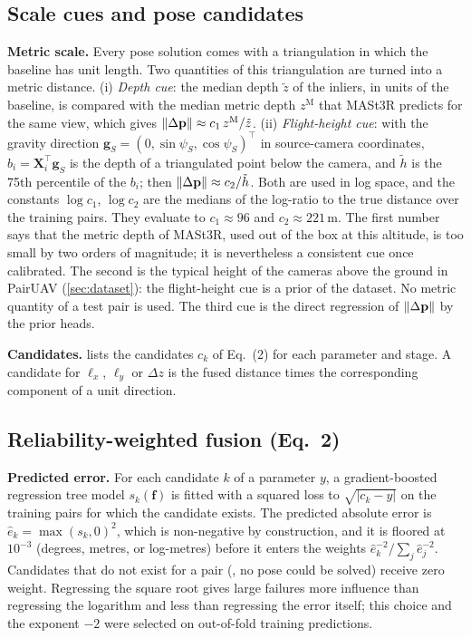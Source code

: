 \subsection{Scale cues and pose candidates}
\label{sec:cands}

\noindent\textbf{Metric scale.} Every pose solution comes with a triangulation in which the baseline has unit length. Two quantities of this triangulation are turned into a metric distance. (i) \emph{Depth cue}: the median depth $\tilde z$ of the inliers, in units of the baseline, is compared with the median metric depth $z^{\mathrm{M}}$ that MASt3R predicts for the same view, which gives $\|\Delta\mathbf{p}\|\approx c_1\,z^{\mathrm{M}}/\tilde z$. (ii) \emph{Flight-height cue}: with the gravity direction $\mathbf{g}_S=(0,\sin\psi_S,\cos\psi_S)^{\!\top}$ in source-camera coordinates, $b_i=\mathbf{X}_i^{\!\top}\mathbf{g}_S$ is the depth of a triangulated point below the camera, and $\tilde h$ is the 75th percentile of the $b_i$; then $\|\Delta\mathbf{p}\|\approx c_2/\tilde h$. Both are used in log space, and the constants $\log c_1$, $\log c_2$ are the medians of the log-ratio to the true distance over the training pairs. They evaluate to $c_1\approx 96$ and $c_2\approx 221$\,m. The first number says that the metric depth of MASt3R, used out of the box at this altitude, is too small by two orders of magnitude; it is nevertheless a consistent cue once calibrated. The second is the typical height of the cameras above the ground in PairUAV (\cref{sec:dataset}): the flight-height cue is a prior of the dataset. No metric quantity of a test pair is used. The third cue is the direct regression of $\|\Delta\mathbf{p}\|$ by the prior heads.

\noindent\textbf{Candidates.}  lists the candidates $c_k$ of Eq.~(2) for each parameter and stage. A candidate for $\ell_x$, $\ell_y$ or $\Delta z$ is the fused distance times the corresponding component of a unit direction.



\subsection{Reliability-weighted fusion (Eq.~2)}
\label{sec:fusion}

\noindent\textbf{Predicted error.} For each candidate $k$ of a parameter $y$, a gradient-boosted regression tree model $s_k(\mathbf{f})$ is fitted with a squared loss to $\sqrt{|c_k-y|}$ on the training pairs for which the candidate exists. The predicted absolute error is $\hat e_k=\max(s_k,0)^2$, which is non-negative by construction, and it is floored at $10^{-3}$ (degrees, metres, or log-metres) before it enters the weights $\hat e_k^{-2}/\sum_j\hat e_j^{-2}$. Candidates that do not exist for a pair (\eg, no pose could be solved) receive zero weight. Regressing the square root gives large failures more influence than regressing the logarithm and less than regressing the error itself; this choice and the exponent $-2$ were selected on out-of-fold training predictions.

